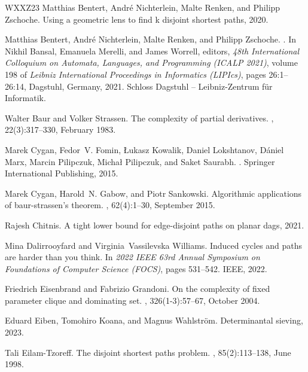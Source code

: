\documentclass[11pt]{article}
\theoremstyle{definition}
\begin{document}
\begin{thebibliography}{WXXZ23}
Matthias Bentert, André Nichterlein, Malte Renken, and Philipp Zschoche.
\newblock Using a geometric lens to find k disjoint shortest paths, 2020.

Matthias Bentert, Andr\'{e} Nichterlein, Malte Renken, and Philipp Zschoche.
.
\newblock In Nikhil Bansal, Emanuela Merelli, and James Worrell, editors, {\em
  48th International Colloquium on Automata, Languages, and Programming (ICALP
  2021)}, volume 198 of {\em Leibniz International Proceedings in Informatics
  (LIPIcs)}, pages 26:1--26:14, Dagstuhl, Germany, 2021. Schloss Dagstuhl --
  Leibniz-Zentrum f{\"u}r Informatik.

Walter Baur and Volker Strassen.
\newblock The complexity of partial derivatives.
, 22(3):317--330, February 1983.

Marek Cygan, Fedor~V. Fomin, {\L}ukasz Kowalik, Daniel Lokshtanov, D{\'{a}}niel
  Marx, Marcin Pilipczuk, Micha{\l} Pilipczuk, and Saket Saurabh.
.
\newblock Springer International Publishing, 2015.

Marek Cygan, Harold~N. Gabow, and Piotr Sankowski.
\newblock Algorithmic applications of baur-strassen's theorem.
, 62(4):1--30, September 2015.

Rajesh Chitnis.
\newblock A tight lower bound for edge-disjoint paths on planar dags, 2021.

Mina Dalirrooyfard and Virginia~Vassilevska Williams.
\newblock Induced cycles and paths are harder than you think.
\newblock In {\em 2022 IEEE 63rd Annual Symposium on Foundations of Computer
  Science (FOCS)}, pages 531--542. IEEE, 2022.

Friedrich Eisenbrand and Fabrizio Grandoni.
\newblock On the complexity of fixed parameter clique and dominating set.
, 326(1-3):57--67, October 2004.

Eduard Eiben, Tomohiro Koana, and Magnus Wahlström.
\newblock Determinantal sieving, 2023.

Tali Eilam-Tzoreff.
\newblock The disjoint shortest paths problem.
, 85(2):113--138, June 1998.


\end{thebibliography}
\end{document}
